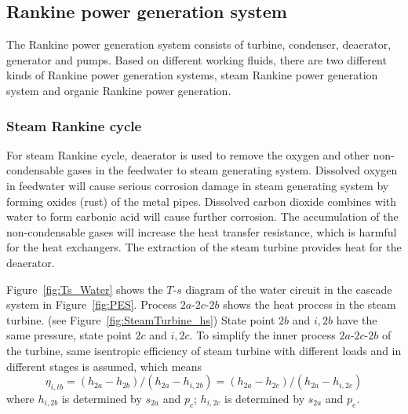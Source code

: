 \subsection{Rankine power generation system}

The Rankine power generation system consists of turbine, condenser, deaerator, generator and pumps. Based on different working fluids, there are two different kinds of Rankine power generation systems, steam Rankine power generation system and organic Rankine power generation.
\subsubsection{Steam Rankine cycle}
  
  For steam Rankine cycle, deaerator is used to remove the oxygen and other non-condensable gases in the feedwater to steam generating system. Dissolved oxygen in feedwater will cause serious corrosion damage in steam generating system by forming oxides (rust) of the metal pipes. Dissolved carbon dioxide combines with water to form carbonic acid will cause further corrosion. The accumulation of the non-condensable gases will increase the heat transfer resistance, which is harmful for the heat exchangers. The extraction of the steam turbine provides heat for the deaerator.
  
  Figure~\ref{fig:Ts_Water} shows the $T$-$s$ diagram of the water circuit in the cascade system in Figure~\ref{fig:PES}. Process $2a$-$2c$-$2b$ shows the heat process in the steam turbine. (see Figure~\ref{fig:SteamTurbine_hs}) State point $2b$ and $i,2b$ have the same pressure, state point $2c$ and $i,2c$. To simplify the inner process $2a$-$2c$-$2b$ of the turbine, same isentropic efficiency of steam turbine with different loads and in different stages is assumed, which means  
  \begin{equation}
      \eta_{i,tb} =(h_{2a}-h_{2b})/(h_{2a}-h_{i,2b}) = (h_{2a}-h_{2c})/(h_{2a}-h_{i,2c})
\end{equation}
where $h_{i,2b}$ is determined by $s_{2a}$ and $p_c$; $h_{i,2c}$ is determined by $s_{2a}$ and $p_e$.

